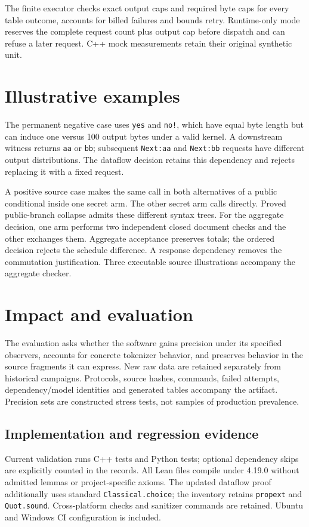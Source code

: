 \documentclass[preprint,12pt,a4paper]{elsarticle}
\begin{document}
The finite executor checks exact output caps and required byte caps for every
table outcome, accounts for billed failures and bounds retry. Runtime-only
mode reserves the complete request count plus output cap before dispatch
and can refuse a later request. C++ mock measurements retain their original
synthetic unit.

\section{Illustrative examples}
The permanent negative case uses \texttt{yes} and \texttt{no!}, which have equal
byte length but can induce one versus 100 output bytes under a valid kernel.
A downstream witness returns \texttt{aa} or \texttt{bb}; subsequent
\texttt{Next:aa} and \texttt{Next:bb} requests have different output
distributions. The dataflow decision retains this dependency and rejects
replacing it with a fixed request.

A positive source case makes the same call in both alternatives of a public
conditional inside one secret arm. The other secret arm calls directly.
Proved public-branch collapse admits these different syntax trees.
For the aggregate decision, one arm performs two independent closed document
checks and the other exchanges them. Aggregate acceptance preserves totals;
the ordered decision rejects the schedule difference. A response dependency
removes the commutation justification. Three executable source illustrations
accompany the aggregate checker.

\section{Impact and evaluation}
The evaluation asks whether the software gains precision under its specified
observers, accounts for concrete tokenizer behavior, and preserves behavior in
the source fragments it can express. New raw data are retained separately from
historical campaigns. Protocols, source hashes, commands, failed attempts,
dependency/model identities and generated tables accompany the artifact.
Precision sets are constructed stress tests, not samples of production
prevalence.

\subsection{Implementation and regression evidence}
Current validation runs \revCppTests{} C++ tests and \revPythonTests{} Python
tests; optional dependency skips are explicitly counted in the records.
All \revProofFiles{} Lean files compile under 4.19.0 without admitted lemmas
or project-specific axioms. The updated dataflow proof additionally uses
standard \texttt{Classical.choice}; the inventory retains
\texttt{propext} and \texttt{Quot.sound}. Cross-platform checks and sanitizer
commands are retained. Ubuntu and Windows CI configuration is included.
\end{document}
